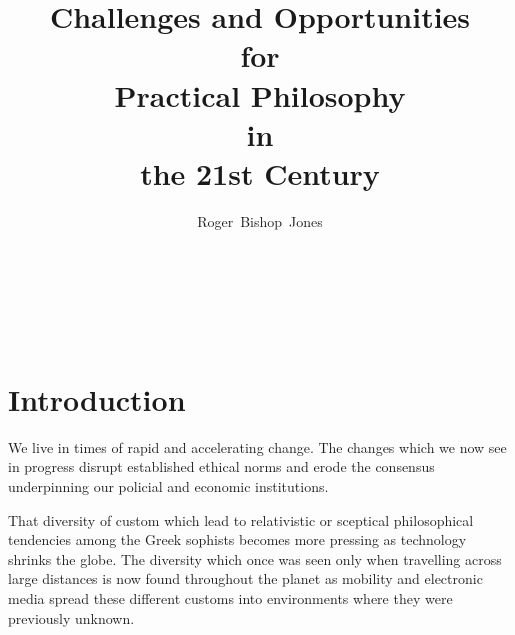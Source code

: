 \documentclass[14pt,titlepage]{extarticle}
\title{Challenges and Opportunities \\for \\Practical Philosophy \\in \\the 21st Century}
\author{Roger~Bishop~Jones}
\date{\ }
\newcommand{\ignore}[1]{}
\begin{document}

                               
\begin{titlepage}
\maketitle





\end{titlepage}

\ \

\ignore{
\begin{centering}
{\LARGE \bf Challenges \\for \\Practical Philosophy \\in \\the 21st Century\\}
\end{centering}
}%

\setcounter{tocdepth}{1}
{\parskip-0pt\tableofcontents}




\section{Introduction}

We live in times of rapid and accelerating change.
The changes which we now see in progress disrupt established ethical norms and erode the consensus underpinning our policial and economic institutions.

That diversity of custom which lead to relativistic or sceptical philosophical tendencies among the Greek sophists becomes more pressing as technology shrinks the globe.
The diversity which once was seen only when travelling across large distances is now found throughout the planet as mobility and electronic media spread these different customs into environments where they were previously unknown.
\end{document}
